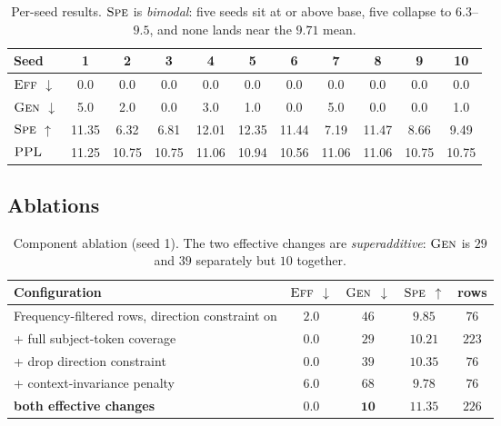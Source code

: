 \documentclass[11pt]{article}
\newcommand{\Eff}{\textsc{Eff}}
\newcommand{\Gen}{\textsc{Gen}}
\newcommand{\Spe}{\textsc{Spe}}
\newcommand{\PPL}{\textsc{PPL}}
\newcommand{\down}{$\downarrow$}
\newcommand{\up}{$\uparrow$}
\begin{document}
\begin{table}[h]
\centering
\caption{Per-seed results. $\Spe$ is \emph{bimodal}: five seeds sit at or above
base, five collapse to $6.3$--$9.5$, and none lands near the $9.71$ mean.}
\label{tab:seeds}
\small
\begin{tabular}{lcccccccccc}
\toprule
Seed & 1 & 2 & 3 & 4 & 5 & 6 & 7 & 8 & 9 & 10 \\
\midrule
$\Eff$ \down & 0.0 & 0.0 & 0.0 & 0.0 & 0.0 & 0.0 & 0.0 & 0.0 & 0.0 & 0.0 \\
$\Gen$ \down & 5.0 & 2.0 & 0.0 & 3.0 & 1.0 & 0.0 & 5.0 & 0.0 & 0.0 & 1.0 \\
$\Spe$ \up   & 11.35 & 6.32 & 6.81 & 12.01 & 12.35 & 11.44 & 7.19 & 11.47 & 8.66 & 9.49 \\
$\PPL$       & 11.25 & 10.75 & 10.75 & 11.06 & 10.94 & 10.56 & 11.06 & 11.06 & 10.75 & 10.75 \\
\bottomrule
\end{tabular}
\end{table}

\subsection{Ablations}

\begin{table}[h]
\centering
\caption{Component ablation (seed 1). The two effective changes are
\emph{superadditive}: $\Gen$ is $29$ and $39$ separately but $10$ together.}
\label{tab:ablation}
\begin{tabular}{lcccc}
\toprule
Configuration & $\Eff$ \down & $\Gen$ \down & $\Spe$ \up & rows \\
\midrule
Frequency-filtered rows, direction constraint on & $2.0$ & $46$ & $9.85$ & $76$ \\
\quad + full subject-token coverage             & $0.0$ & $29$ & $10.21$ & $223$ \\
\quad + drop direction constraint               & $0.0$ & $39$ & $10.35$ & $76$ \\
\quad + context-invariance penalty              & $6.0$ & $68$ & $9.78$ & $76$ \\
\textbf{both effective changes}                 & $\mathbf{0.0}$ & $\mathbf{10}$ & $\mathbf{11.35}$ & $226$ \\
\bottomrule
\end{tabular}
\end{table}
\end{document}
